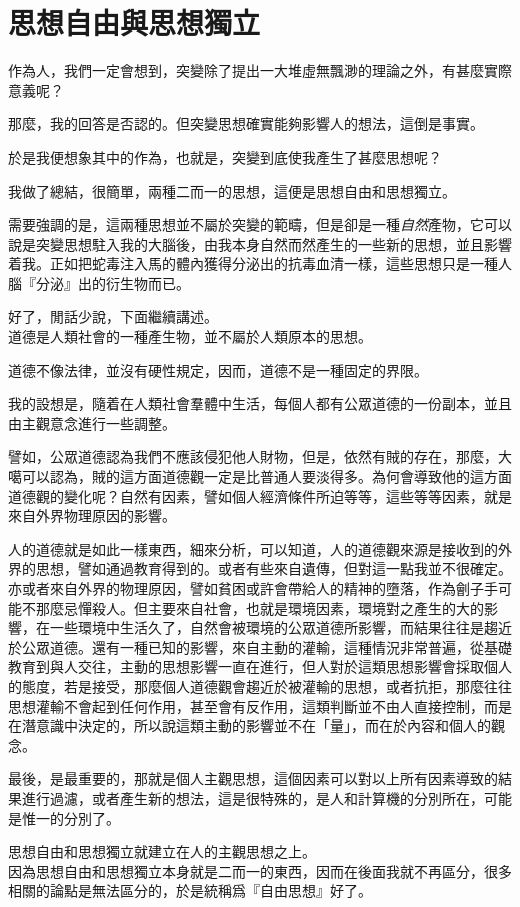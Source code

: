 \chapter{思想自由與思想獨立}

作為人，我們一定會想到，突變除了提出一大堆虛無飄渺的理論之外，有甚麼實際意義呢？

那麼，我的回答是否認的。但突變思想確實能夠影響人的想法，這倒是事實。

於是我便想象其中的作為，也就是，突變到底使我產生了甚麼思想呢？

我做了總結，很簡單，兩種二而一的思想，這便是思想自由和思想獨立。

需要強調的是，這兩種思想並不屬於突變的範疇，但是卻是一種\emph{自然}產物，它可以說是突變思想駐入我的大腦後，由我本身自然而然產生的一些新的思想，並且影響着我。正如把蛇毒注入馬的體內獲得分泌出的抗毒血清一樣，這些思想只是一種人腦『分泌』出的衍生物而已。

好了，閒話少說，下面繼續講述。
\\

道德是人類社會的一種產生物，並不屬於人類原本的思想。

道德不像法律，並沒有硬性規定，因而，道德不是一種固定的界限。

我的設想是，隨着在人類社會羣體中生活，每個人都有公眾道德的一份副本，並且由主觀意念進行一些調整。

譬如，公眾道德認為我們不應該侵犯他人財物，但是，依然有賊的存在，那麼，大噶可以認為，賊的這方面道德觀一定是比普通人要淡得多。為何會導致他的這方面道德觀的變化呢？自然有因素，譬如個人經濟條件所迫等等，這些等等因素，就是來自外界物理原因的影響。

人的道德就是如此一樣東西，細來分析，可以知道，人的道德觀來源是接收到的外界的思想，譬如通過教育得到的。或者有些來自遺傳，但對這一點我並不很確定。亦或者來自外界的物理原因，譬如貧困或許會帶給人的精神的墮落，作為劊子手可能不那麼忌憚殺人。但主要來自社會，也就是環境因素，環境對之產生的大的影響，在一些環境中生活久了，自然會被環境的公眾道德所影響，而結果往往是趨近於公眾道德。還有一種已知的影響，來自主動的灌輸，這種情況非常普遍，從基礎教育到與人交往，主動的思想影響一直在進行，但人對於這類思想影響會採取個人的態度，若是接受，那麼個人道德觀會趨近於被灌輸的思想，或者抗拒，那麼往往思想灌輸不會起到任何作用，甚至會有反作用，這類判斷並不由人直接控制，而是在潛意識中決定的，所以說這類主動的影響並不在「量」，而在於內容和個人的觀念。

最後，是最重要的，那就是個人主觀思想，這個因素可以對以上所有因素導致的結果進行過濾，或者產生新的想法，這是很特殊的，是人和計算機的分別所在，可能是惟一的分別了。

思想自由和思想獨立就建立在人的主觀思想之上。
\\

因為思想自由和思想獨立本身就是二而一的東西，因而在後面我就不再區分，很多相關的論點是無法區分的，於是統稱爲『自由思想』好了。

